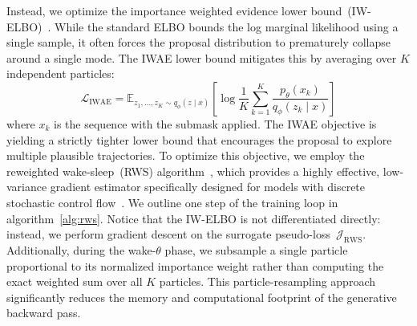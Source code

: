 \documentclass[11pt]{article}
\theoremstyle{plain}
\theoremstyle{definition}
\begin{document}
Instead, we optimize the importance weighted evidence lower
bound~(IW-ELBO)~\cite{iwae-2016}. While the standard ELBO bounds the log
marginal likelihood using a single sample, it often forces the proposal
distribution to prematurely collapse around a single mode. The IWAE lower bound
mitigates this by averaging over \( K \) independent particles:
\[
  \mathcal{L}_{\text{IWAE}}
  = \mathbb{E}_{z_1, \dots, z_K \sim q_\phi(z \mid x)}
  \left[ \log \frac{1}{K} \sum_{k=1}^K
    \frac{p_\theta(x_k)}{q_\phi(z_k \mid x)}
  \right]
\]
where \( x_k \) is the sequence with the submask applied. The IWAE objective is
yielding a strictly tighter lower bound that encourages the proposal to explore
multiple plausible trajectories. To optimize this objective, we employ the
reweighted wake-sleep~(RWS) algorithm~\cite{rws-2015}, which provides a highly
effective, low-variance gradient estimator specifically designed for models with
discrete stochastic control flow~\cite{revisiting-rws-2019,decision-iwae-2020}.
We outline one step of the training loop in algorithm~\ref{alg:rws}. Notice that
the IW-ELBO is not differentiated directly: instead, we perform gradient descent
on the surrogate pseudo-loss~\( \mathcal{J}_{\text{RWS}} \). Additionally,
during the wake-\(\theta\) phase, we subsample a single particle proportional to
its normalized importance weight rather than computing the exact weighted sum
over all \( K \) particles. This particle-resampling approach significantly
reduces the memory and computational footprint of the generative backward pass.
\end{document}
